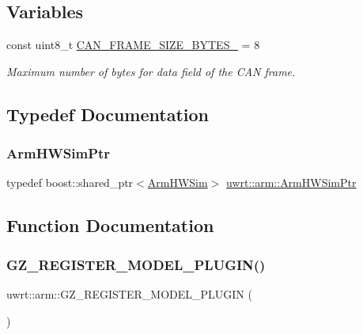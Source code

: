 \subsection*{Variables}
\begin{DoxyCompactItemize}
\item 
const uint8\+\_\+t \hyperlink{namespaceuwrt_1_1arm_ad353395d3b0d46797e243b550226f066}{C\+A\+N\+\_\+\+F\+R\+A\+M\+E\+\_\+\+S\+I\+Z\+E\+\_\+\+B\+Y\+T\+E\+S\+\_\+} = 8
\begin{DoxyCompactList}\small\item\em Maximum number of bytes for data field of the C\+AN frame. \end{DoxyCompactList}\end{DoxyCompactItemize}


\subsection{Typedef Documentation}
\mbox{\label{namespaceuwrt_1_1arm_a74b3a52f0f9eae5e40d20a1a07334eb8}} 
\subsubsection{\texorpdfstring{Arm\+H\+W\+Sim\+Ptr}{ArmHWSimPtr}}
{\footnotesize\ttfamily typedef boost\+::shared\+\_\+ptr$<$\hyperlink{classuwrt_1_1arm_1_1_arm_h_w_sim}{Arm\+H\+W\+Sim}$>$ \hyperlink{namespaceuwrt_1_1arm_a74b3a52f0f9eae5e40d20a1a07334eb8}{uwrt\+::arm\+::\+Arm\+H\+W\+Sim\+Ptr}}



\subsection{Function Documentation}
\mbox{\label{namespaceuwrt_1_1arm_a1cd9b55d4936d61e403fc111a9f444c2}} 
\subsubsection{\texorpdfstring{G\+Z\+\_\+\+R\+E\+G\+I\+S\+T\+E\+R\+\_\+\+M\+O\+D\+E\+L\+\_\+\+P\+L\+U\+G\+I\+N()}{GZ\_REGISTER\_MODEL\_PLUGIN()}}
{\footnotesize\ttfamily uwrt\+::arm\+::\+G\+Z\+\_\+\+R\+E\+G\+I\+S\+T\+E\+R\+\_\+\+M\+O\+D\+E\+L\+\_\+\+P\+L\+U\+G\+IN (\begin{DoxyParamCaption}\item[{\hyperlink{classuwrt_1_1arm_1_1_gazebo_arm_control_plugin}{Gazebo\+Arm\+Control\+Plugin}}]{ }\end{DoxyParamCaption})}




